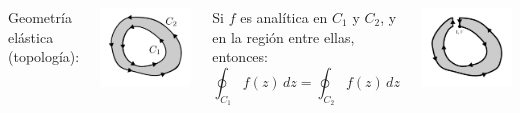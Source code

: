 \documentclass[9pt, aspectratio=169]{beamer}
\begin{document}
\begin{frame}
 \begin{columns}[t]
    \cx
    Geometría elástica (topología):
  \begin{center}
      \includegraphics[scale=0.45]{figs/fig-04.pdf}
  \end{center}

  Si $f$ es analítica en $C_1$ y $C_2$, y en la región entre ellas, entonces:
  \[ \oint_{C_1} f(z) \, dz = \oint_{C_2} f(z) \, dz \]
  \begin{center}
      \includegraphics[scale=0.45]{figs/fig-04b.pdf}
  \end{center}


\end{columns}
\end{frame}
\end{document}
